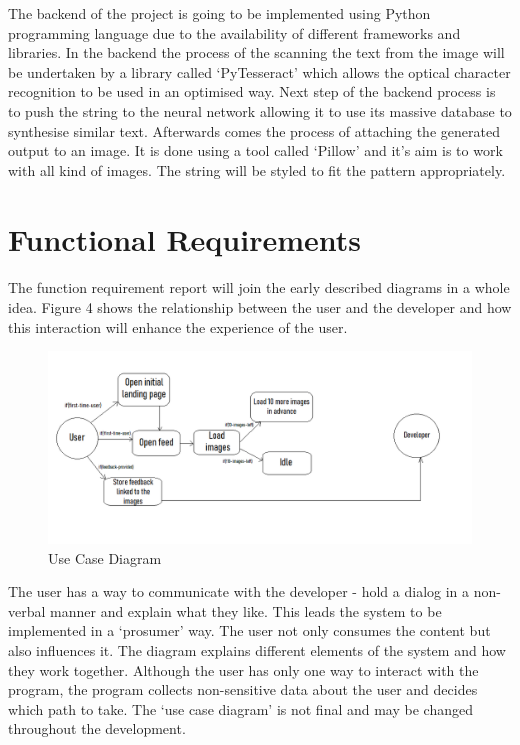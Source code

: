 \documentclass[12pt]{report}
\begin{document}
    The backend of the project is going to be implemented using Python programming language due to the availability of different frameworks and libraries. In the backend the process of the scanning the text from the image will be undertaken by a library called `PyTesseract' which allows the optical character recognition to be used in an optimised way.
    Next step of the backend process is to push the string to the neural network allowing it to use its massive database to synthesise similar text. Afterwards comes the process of attaching the generated output to an image. It is done using a tool called `Pillow' and it's aim is to work with all kind of images. The string will be styled to fit the pattern appropriately.

    \clearpage

    \section*{Functional Requirements}
    \paragraph{}

    The function requirement report will join the early described diagrams in a whole idea. Figure 4 shows the relationship between the user and the developer and how this interaction will enhance the experience of the user.

    \begin{figure}[htbp]
        \centerline{\includegraphics[scale=.5]{img/use-case-diagram.png}}
        \label{use_case_diagram}
        \caption{Use Case Diagram}
    \end{figure}

    The user has a way to communicate with the developer - hold a dialog in a non-verbal manner and explain what they like. This leads the system to be implemented in a `prosumer' way. The user not only consumes the content but also influences it. 
    The diagram explains different elements of the system and how they work together. Although the user has only one way to interact with the program, the program collects non-sensitive data about the user and decides which path to take. The `use case diagram' is not final and may be changed throughout the development.
\end{document}
